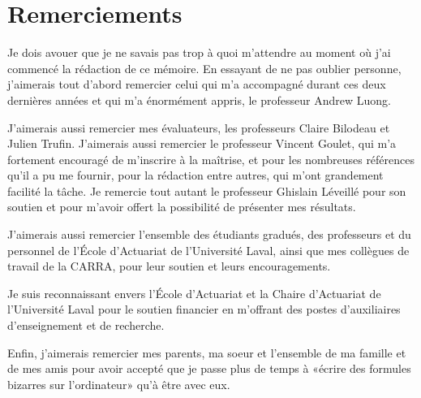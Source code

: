 \chapter*{Remerciements} %

Je dois avouer que je ne savais pas trop à quoi m'attendre au moment où j'ai commencé la rédaction de ce mémoire. En essayant de ne pas oublier personne, j'aimerais tout d'abord remercier celui qui m'a accompagné durant ces deux dernières années et qui m'a énormément appris, le professeur Andrew Luong. 

J'aimerais aussi remercier mes évaluateurs, les professeurs Claire Bilodeau et Julien Trufin. J'aimerais aussi remercier le professeur Vincent Goulet, qui m'a fortement encouragé de m'inscrire à la maîtrise, et pour les nombreuses références qu'il a pu me fournir, pour la rédaction entre autres, qui m'ont grandement facilité la tâche. Je remercie tout autant le professeur Ghislain Léveillé pour son soutien et pour m'avoir offert la possibilité de présenter mes résultats.

J'aimerais aussi remercier l'ensemble des étudiants gradués, des professeurs et du personnel de l'École d'Actuariat de l'Université Laval, ainsi que mes collègues de travail de la CARRA, pour leur soutien et leurs encouragements. 

Je suis reconnaissant envers l'École d'Actuariat et la Chaire d'Actuariat de l'Université Laval pour le soutien financier en m'offrant des postes d'auxiliaires d'enseignement et de recherche.

Enfin, j'aimerais remercier mes parents, ma soeur et l'ensemble de ma famille et de mes amis pour avoir accepté que je passe plus de temps à «écrire des formules bizarres sur l'ordinateur» qu'à être avec eux.

